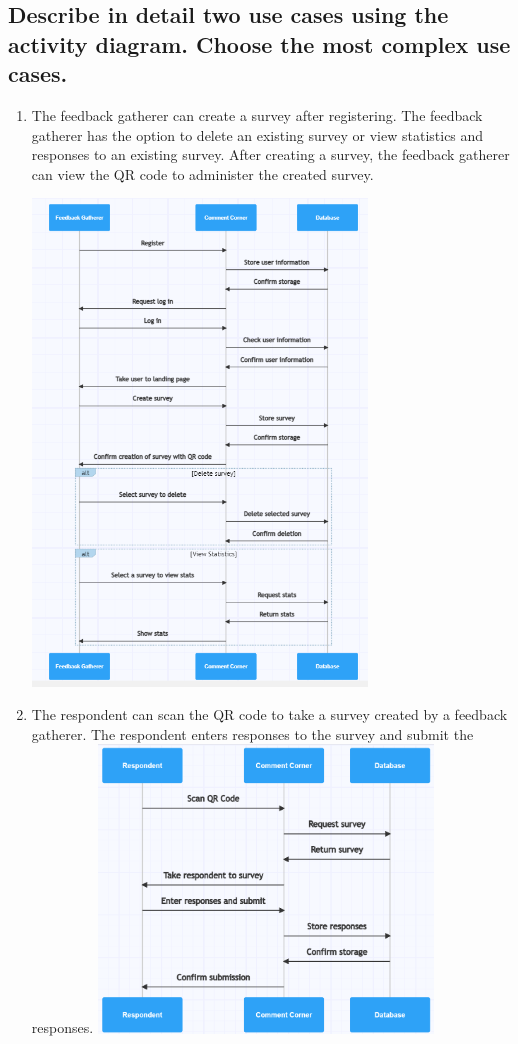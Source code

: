 \documentclass[letterpaper, 12 pt, conference]{ieeeconf}
\begin{document}
\newpage
\subsection{Describe in detail two use cases using the activity diagram. Choose the most complex use cases.}
\begin{enumerate}
    \item The feedback gatherer can create a survey after registering. The feedback gatherer has the option to delete an existing survey or view statistics and responses to an existing survey. After creating a survey, the feedback gatherer can view the QR code to administer the created survey.
    \hfill \break

    \includegraphics[width=0.70\textwidth]{feedbackGatherer.png}
\newpage
    \item The respondent can scan the QR code to take a survey created by a feedback gatherer. The respondent enters responses to the survey and submit the responses.
    \linebreak
    \hfill \break
    \includegraphics[width=0.70\textwidth]{respondent.png}
    

\end{enumerate}
\hfill \break
\newpage
\end{document}
